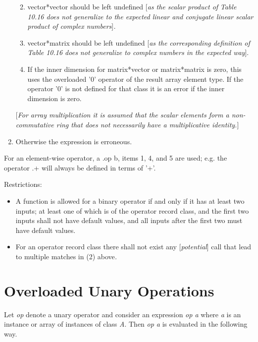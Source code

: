 \documentclass[10pt,a4paper]{report}
\def\doublelabel#1{\label{#1}}
\renewcommand{\labelenumi}{\arabic{enumi}.}
\renewcommand{\labelenumii}{\labelenumi\arabic{enumii}.}
\begin{document}
\begin{enumerate}
  \begin{enumerate}
  \def\labelenumii{(\alph{enumii})}
  \item
    vector*vector should be left undefined {[}\emph{as the scalar
    product of} \emph{Table 10.16 does not generalize to the expected
    linear and conjugate linear scalar product of complex
    numbers}{]}\emph{.}
  \item
    vector*matrix should be left undefined {[}\emph{as the corresponding
    definition of} \emph{Table 10.16 does not generalize to complex
    numbers in the expected way}{]}.
  \item
    If the inner dimension for matrix*vector or matrix*matrix is zero,
    this uses the overloaded '0' operator of the result array element
    type. If the operator '0' is not defined for that class it is an
    error if the inner dimension is zero.
  \end{enumerate}
{[}\emph{For array multiplication it is assumed that the scalar elements
form a non-commutative ring that does not necessarily have a
multiplicative identity.}{]}
\item
  Otherwise the expression is erroneous.
\end{enumerate}

For an element-wise operator, a .op b, items 1, 4, and 5 are used; e.g.
the operator .+ will always be defined in terms of '+'.

Restrictions:

\begin{itemize}
\item
  A function is allowed for a binary operator if and only if it has at
  least two inputs; at least one of which is of the operator record
  class, and the first two inputs shall not have default values, and all
  inputs after the first two must have default values.
\item
  For an operator record class there shall not exist {any}
  {[}\emph{potential}{]} call that lead to multiple matches in (2)
  above\emph{.}
\end{itemize}

\section{Overloaded Unary Operations}\doublelabel{overloaded-unary-operations}

Let \emph{op} denote a unary operator and consider an expression
\emph{op a} where \emph{a} is an instance or array of instances of class
\emph{A}. Then \emph{op a} is evaluated in the following way.
\end{document}
